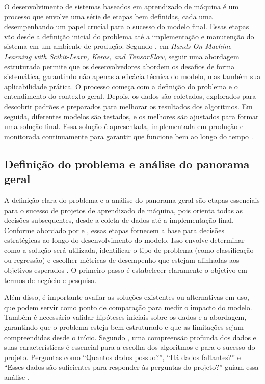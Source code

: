 O desenvolvimento de sistemas baseados em aprendizado de máquina é um processo que envolve uma série de etapas bem definidas, cada uma desempenhando um papel crucial para o sucesso do modelo final. Essas etapas vão desde a definição inicial do problema até a implementação e manutenção do sistema em um ambiente de produção. Segundo , em \textit{Hands-On Machine Learning with Scikit-Learn, Keras, and TensorFlow}, seguir uma abordagem estruturada permite que os desenvolvedores abordem os desafios de forma sistemática, garantindo não apenas a eficácia técnica do modelo, mas também sua aplicabilidade prática. O processo começa com a definição do problema e o entendimento do contexto geral. Depois, os dados são coletados, explorados para descobrir padrões e preparados para melhorar os resultados dos algoritmos. Em seguida, diferentes modelos são testados, e os melhores são ajustados para formar uma solução final. Essa solução é apresentada, implementada em produção e monitorada continuamente para garantir que funcione bem ao longo do tempo \cite{geron2017}.

\subsection{Definição do problema e análise do panorama geral}
A definição clara do problema e a análise do panorama geral são etapas essenciais para o sucesso de projetos de aprendizado de máquina, pois orienta todas as decisões subsequentes, desde a coleta de dados até a implementação final. Conforme abordado por  e , essas etapas fornecem a base para decisões estratégicas ao longo do desenvolvimento do modelo.  Isso envolve determinar como a solução será utilizada, identificar o tipo de problema (como classificação ou regressão) e escolher métricas de desempenho que estejam alinhadas aos objetivos esperados \cite{geron2017}. O primeiro passo é estabelecer claramente o objetivo em termos de negócio e pesquisa. 

Além disso, é importante avaliar as soluções existentes ou alternativas em uso, que podem servir como ponto de comparação para medir o impacto do modelo. Também é necessário validar hipóteses iniciais sobre os dados e a abordagem, garantindo que o problema esteja bem estruturado e que as limitações sejam compreendidas desde o início. Segundo , uma compreensão profunda dos dados e suas características é essencial para a escolha dos algoritmos e para o sucesso do projeto. Perguntas como “Quantos dados possuo?”, “Há dados faltantes?” e “Esses dados são suficientes para responder às perguntas do projeto?” guiam essa análise \cite{muller2017}.

